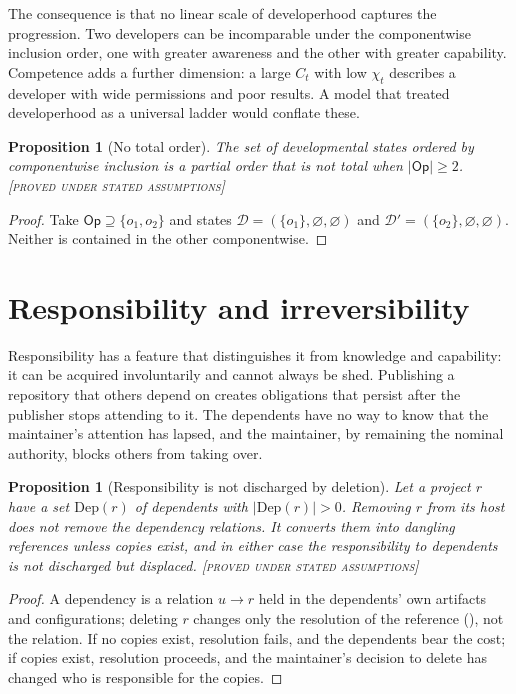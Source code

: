 \documentclass[11pt,twoside,openright]{book}
\theoremstyle{plain}
\newtheorem{proposition}[theorem]{Proposition}
\theoremstyle{definition}
\theoremstyle{remark}
\newcommand{\Proved}{\textup{\textsc{[proved under stated assumptions]}}}
\begin{document}
The consequence is that no linear scale of developerhood captures the progression. Two developers can be incomparable under the componentwise inclusion order, one with greater awareness and the other with greater capability. Competence adds a further dimension: a large $C_t$ with low $\chi_t$ describes a developer with wide permissions and poor results. A model that treated developerhood as a universal ladder would conflate these.

\begin{proposition}[No total order]\label{prop:nototal}
The set of developmental states ordered by componentwise inclusion is a partial order that is not total when $|\mathsf{Op}|\ge2$.
\Proved{}
\end{proposition}

\begin{proof}
Take $\mathsf{Op}\supseteq\{o_1,o_2\}$ and states $\mathcal{D}=(\{o_1\},\varnothing,\varnothing)$ and $\mathcal{D}'=(\{o_2\},\varnothing,\varnothing)$. Neither is contained in the other componentwise.
\end{proof}

\section{Responsibility and irreversibility}

Responsibility has a feature that distinguishes it from knowledge and capability: it can be acquired involuntarily and cannot always be shed. Publishing a repository that others depend on creates obligations that persist after the publisher stops attending to it. The dependents have no way to know that the maintainer's attention has lapsed, and the maintainer, by remaining the nominal authority, blocks others from taking over.

\begin{proposition}[Responsibility is not discharged by deletion]\label{prop:resp}
Let a project $r$ have a set $\mathrm{Dep}(r)$ of dependents with $|\mathrm{Dep}(r)|>0$. Removing $r$ from its host does not remove the dependency relations. It converts them into dangling references unless copies exist, and in either case the responsibility to dependents is not discharged but displaced.
\Proved{}
\end{proposition}

\begin{proof}
A dependency is a relation $u\to r$ held in the dependents' own artifacts and configurations; deleting $r$ changes only the resolution of the reference (), not the relation. If no copies exist, resolution fails, and the dependents bear the cost; if copies exist, resolution proceeds, and the maintainer's decision to delete has changed who is responsible for the copies.
\end{proof}
\end{document}
